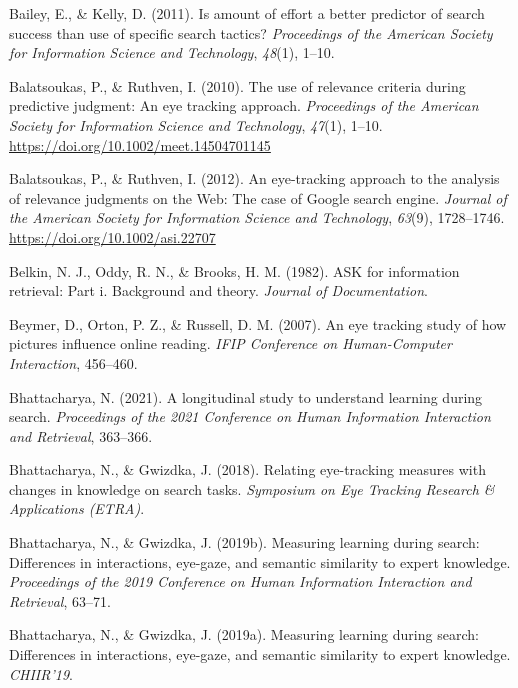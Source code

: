 \documentclass[letterpaper, nobind]{templates/ociamthesis}
\newlength{\cslhangindent}
\newenvironment{CSLReferences}[2] %
 {%
  \setlength{\parindent}{0pt}
  \ifodd #1
  \let\oldpar\par
  \def\par{\hangindent=\cslhangindent\oldpar}
  \fi
  \setlength{\parskip}{1mm}
  \setlength{\baselineskip}{6mm}
 }%
 {}
\begin{document}
\begin{CSLReferences}{1}{0}
\leavevmode{}%
Bailey, E., \& Kelly, D. (2011). Is amount of effort a better predictor of search success than use of specific search tactics? \emph{Proceedings of the American Society for Information Science and Technology}, \emph{48}(1), 1--10.

\leavevmode{}%
Balatsoukas, P., \& Ruthven, I. (2010). The use of relevance criteria during predictive judgment: {An} eye tracking approach. \emph{Proceedings of the American Society for Information Science and Technology}, \emph{47}(1), 1--10. \url{https://doi.org/10.1002/meet.14504701145}

\leavevmode{}%
Balatsoukas, P., \& Ruthven, I. (2012). An eye-tracking approach to the analysis of relevance judgments on the {Web}: {The} case of {Google} search engine. \emph{Journal of the American Society for Information Science and Technology}, \emph{63}(9), 1728--1746. \url{https://doi.org/10.1002/asi.22707}

\leavevmode{}%
Belkin, N. J., Oddy, R. N., \& Brooks, H. M. (1982). ASK for information retrieval: Part i. Background and theory. \emph{Journal of Documentation}.

\leavevmode{}%
Beymer, D., Orton, P. Z., \& Russell, D. M. (2007). An eye tracking study of how pictures influence online reading. \emph{IFIP Conference on Human-Computer Interaction}, 456--460.

\leavevmode{}%
Bhattacharya, N. (2021). A longitudinal study to understand learning during search. \emph{Proceedings of the 2021 Conference on Human Information Interaction and Retrieval}, 363--366.

\leavevmode{}%
Bhattacharya, N., \& Gwizdka, J. (2018). Relating eye-tracking measures with changes in knowledge on search tasks. \emph{Symposium on Eye Tracking Research \& Applications (ETRA)}.

\leavevmode{}%
Bhattacharya, N., \& Gwizdka, J. (2019b). Measuring learning during search: Differences in interactions, eye-gaze, and semantic similarity to expert knowledge. \emph{Proceedings of the 2019 Conference on Human Information Interaction and Retrieval}, 63--71.

\leavevmode{}%
Bhattacharya, N., \& Gwizdka, J. (2019a). Measuring learning during search: Differences in interactions, eye-gaze, and semantic similarity to expert knowledge. \emph{CHIIR'19}.


\end{CSLReferences}
\end{document}
